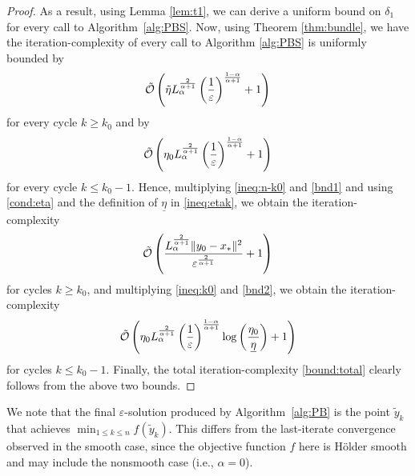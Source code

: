 \documentclass[11pt,letterpaper]{article}
\begin{document}
\begin{proof}
As a result, using Lemma \ref{lem:t1}, we can derive a uniform bound on $\delta_1$ for every call to Algorithm~\ref{alg:PBS}.
Now, using Theorem \ref{thm:bundle}, we have the iteration-complexity of every call to Algorithm \ref{alg:PBS} is uniformly bounded by
\begin{equation}\label{bnd1}
    \tilde {\cal O}\left(\tilde \eta L_\alpha^{\frac{2}{\alpha+1}} \left(\frac{1}{\varepsilon}\right)^{\frac{1-\alpha}{\alpha+1}} +1 \right)
\end{equation}
for every cycle $k\ge k_0$ and by
\begin{equation}\label{bnd2}
    \tilde {\cal O}\left(\eta_0 L_\alpha^{\frac{2}{\alpha+1}} \left(\frac{1}{\varepsilon}\right)^{\frac{1-\alpha}{\alpha+1}} +1  \right)
\end{equation}
for every cycle $k\le k_0-1$.
Hence, multiplying \eqref{ineq:n-k0} and \eqref{bnd1} and using \eqref{cond:eta} and the definition of $\underline{\eta}$ in \eqref{ineq:etak}, we obtain the iteration-complexity  
\[
\tilde {\cal O}\left(\frac{L_\alpha^{\frac{2}{\alpha+1}} \|y_0-x_*\|^2}{\varepsilon^{\frac{2}{\alpha+1}}} +1 \right)
\]
for cycles $k\ge k_0$,
and multiplying \eqref{ineq:k0} and \eqref{bnd2}, we obtain the iteration-complexity  
\[
\tilde {\cal O}\left(\eta_0 L_\alpha^{\frac{2}{\alpha+1}} \left(\frac{1}{\varepsilon}\right)^{\frac{1-\alpha}{\alpha+1}}
        \log\left(\frac{\eta_0}{\underline{\eta}}\right) +1 \right)
\]
for cycles $k\le k_0-1$.
Finally, the total iteration-complexity \eqref{bound:total} clearly follows from the above two bounds.
\end{proof}

We note that the final $\varepsilon$-solution produced by Algorithm~\ref{alg:PB} is the point $\tilde y_k$ that achieves $\min_{1 \le k \le n} f(\tilde{y}_k)$. This differs from the last-iterate convergence observed in the smooth case, since the objective function $f$ here is Hölder smooth and may include the nonsmooth case (i.e., $\alpha = 0$).
\end{document}
